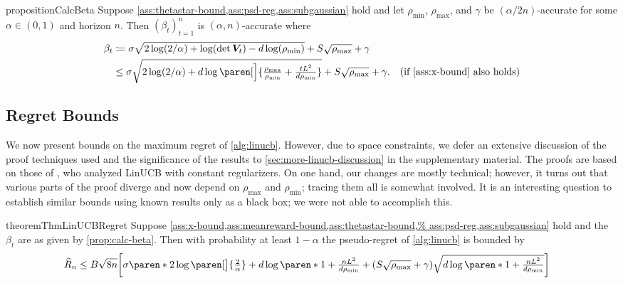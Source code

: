 \documentclass{article}
\renewcommand{\vec}[1]{\bm{#1}}
\newcommand{\defeq}{\coloneq}
\renewcommand{\det}{\operatorname{det}}
\DeclarePairedDelimiter{\paren}()
\DeclarePairedDelimiter{\brck}{[}{]}
\begin{document}
\begin{restatable}{proposition}{CalcBeta}%
  \label{prop:calc-beta}
  Suppose
  \cref{ass:thetastar-bound,ass:psd-reg,ass:subgaussian}
  hold and let $\rho_{\min}$, $\rho_{\max}$, and $\gamma$ be
  $(\alpha/2n)$-accurate for some $\alpha\in(0,1)$ and horizon $n$.
  Then $(\beta_t)_{t=1}^n$ is $(\alpha,n)$-accurate where
  \begin{align*}
    \beta_t
    &\defeq \sigma\sqrt{2\log(2/\alpha) + \log(\det \vec V_t) - d\log(\rho_{\min})}
      + S\sqrt{\rho_{\max}} + \gamma \\
    &\le \sigma\sqrt{2\log({2}/{\alpha}) + d\log\paren[\Big]{\tfrac{\rho_{\max}}{\rho_{\min}}
      + \tfrac{tL^2}{d\rho_{\min}}}}
      + S\sqrt{\rho_{\max}} + \gamma.
    &\text{(if \cref{ass:x-bound} also holds)}
  \end{align*}
\end{restatable}

\vspace{-5pt}
\subsection{Regret Bounds}
\label{sec:regret-bounds}

We now present bounds on the maximum regret of \cref{alg:linucb}.
However, due to space constraints, we defer an extensive discussion of
the proof techniques used and the significance of the results to
\cref{sec:more-linucb-discussion} in the supplementary material.  The
proofs are based on those of
\citet{AbbasiYadkoriImprovedAlgorithmsLinear2011}, who analyzed LinUCB
with constant regularizers.  On one hand, our changes are mostly
technical; however, it turns out that various parts of the proof
diverge and now depend on $\rho_{\max}$ and $\rho_{\min}$; tracing
them all is somewhat involved.  It is an interesting question to
establish similar bounds using known results only as a black box; we
were not able to accomplish this.

\begin{restatable}{theorem}{ThmLinUCBRegret}%
  \label{thm:linucb-regret}%
  Suppose \cref{ass:x-bound,ass:meanreward-bound,ass:thetastar-bound,%
    ass:psd-reg,ass:subgaussian} hold and the
  $\beta_t$ are as given by \cref{prop:calc-beta}.  Then with
  probability at least $1-\alpha$ the pseudo-regret of
  \cref{alg:linucb} is bounded by
    \begin{align}
    \label{eq:regret_general_formula}
    \widehat R_n
    &\le B \sqrt{8n}\brck[\bigg]{\sigma\paren*{2\log\paren[\big]{\tfrac{2}{\alpha}}
      + d\log\paren*{1 + \tfrac{nL^2}{d\rho_{\min}}}}
      + (S\sqrt{\rho_{\max}} + \gamma)\sqrt{d\log\paren*{1 + \tfrac{nL^2}{d\rho_{\min}}}}}
  \end{align}
\end{restatable}
\end{document}
